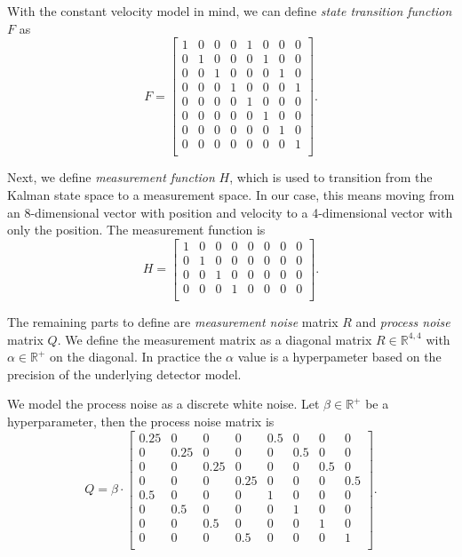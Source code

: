 With the constant velocity model in mind, we can define \textit{state transition function} $F$ as
$$
F = \begin{bmatrix}
 1 & 0 & 0 & 0 & 1 & 0 & 0 & 0 \\
 0 & 1 & 0 & 0 & 0 & 1 & 0 & 0 \\
 0 & 0 & 1 & 0 & 0 & 0 & 1 & 0 \\
 0 & 0 & 0 & 1 & 0 & 0 & 0 & 1 \\
 0 & 0 & 0 & 0 & 1 & 0 & 0 & 0 \\
 0 & 0 & 0 & 0 & 0 & 1 & 0 & 0 \\
 0 & 0 & 0 & 0 & 0 & 0 & 1 & 0 \\
 0 & 0 & 0 & 0 & 0 & 0 & 0 & 1 \\
\end{bmatrix}.
$$

Next, we define \textit{measurement function} $H$, which is used to transition from the Kalman state space to a measurement space. In our case, this means moving from an 8-dimensional vector with position and velocity to a 4-dimensional vector with only the position. The measurement function is
$$
H = \begin{bmatrix}
 1 & 0 & 0 & 0 & 0 & 0 & 0 & 0 \\
 0 & 1 & 0 & 0 & 0 & 0 & 0 & 0 \\
 0 & 0 & 1 & 0 & 0 & 0 & 0 & 0 \\
 0 & 0 & 0 & 1 & 0 & 0 & 0 & 0 \\
\end{bmatrix}.
$$

The remaining parts to define are \textit{measurement noise} matrix $R$ and \textit{process noise} matrix $Q$. We define the measurement matrix as a diagonal matrix $R \in \mathbb{R}^{4,4}$ with $\alpha \in \mathbb{R}^+$ on the diagonal. In practice the $\alpha$ value is a hyperpameter based on the precision of the underlying detector model.

We model the process noise as a discrete white noise. Let $\beta \in \mathbb{R}^+$ be a hyperparameter, then the process noise matrix is
$$
Q = \beta \cdot \begin{bmatrix}
 0.25 & 0    & 0    & 0    & 0.5 & 0   & 0   & 0   \\
 0    & 0.25 & 0    & 0    & 0   & 0.5 & 0   & 0   \\
 0    & 0    & 0.25 & 0    & 0   & 0   & 0.5 & 0   \\
 0    & 0    & 0    & 0.25 & 0   & 0   & 0   & 0.5 \\
 0.5  & 0    & 0    & 0    & 1   & 0   & 0   & 0   \\
 0    & 0.5  & 0    & 0    & 0   & 1   & 0   & 0   \\
 0    & 0    & 0.5  & 0    & 0   & 0   & 1   & 0   \\
 0    & 0    & 0    & 0.5  & 0   & 0   & 0   & 1   \\
\end{bmatrix}.
$$

